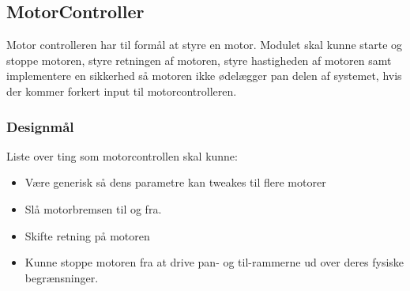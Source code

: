 \subsection{MotorController}
Motor controlleren har til formål at styre en motor. Modulet skal kunne starte og stoppe motoren, styre retningen af motoren, styre hastigheden af motoren samt implementere en sikkerhed så motoren ikke ødelægger pan delen af systemet, hvis der kommer forkert input til motorcontrolleren.

\subsubsection{Designmål}
Liste over ting som motorcontrollen skal kunne:
\begin{itemize}[noitemsep]
	\item Være generisk så dens parametre kan tweakes til flere motorer
	\item Slå motorbremsen til og fra.
	\item Skifte retning på motoren
	\item Kunne stoppe motoren fra at drive pan- og til-rammerne ud over deres fysiske begrænsninger.
\end{itemize}

